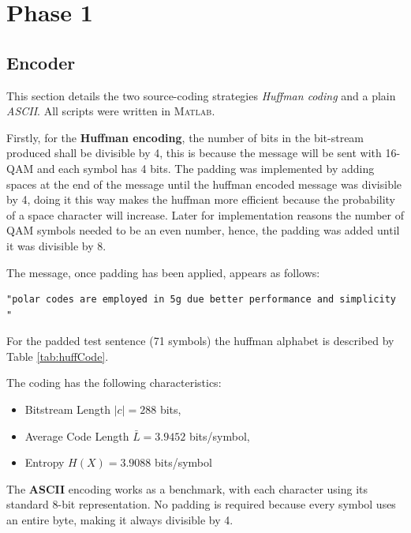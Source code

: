 \section{Phase 1}

\subsection{Encoder}

\label{sec:encoder}

This section details the two source-coding strategies \emph{Huffman coding} and a plain \emph{ASCII}. All scripts were written in \textsc{Matlab}.

\label{ssec:huffman}

Firstly, for the \textbf{Huffman encoding}, the number of bits in the bit-stream produced shall be divisible by 4, this is because the message will be sent with 16-QAM and each symbol has 4 bits. The padding was implemented by adding spaces at the end of the message until the huffman encoded message was divisible by 4, doing it this way makes the huffman more efficient because the probability of a space character will increase. Later for implementation reasons the number of QAM symbols needed to be an even number, hence, the padding was added until it was divisible by 8. 

The message, once padding has been applied, appears as follows:

\begin{center}
	\begin{verbatim}
"polar codes are employed in 5g due better performance and simplicity     "
	\end{verbatim}
	
\end{center}

For the padded test sentence (71 symbols) the huffman alphabet is described by Table \ref{tab:huffCode}.

The coding has the following characteristics:

\begin{itemize}
  \item Bitstream Length $\lvert c\rvert = 288$ bits,
  \item Average Code Length $\bar L = 3.9452$ bits/symbol,
  \item Entropy $H(X)=3.9088$ bits/symbol
\end{itemize}



The \textbf{ASCII} encoding works as a benchmark, with each character using its standard 8-bit representation. No padding is required because every symbol uses an entire byte, making it always divisible by 4. 

